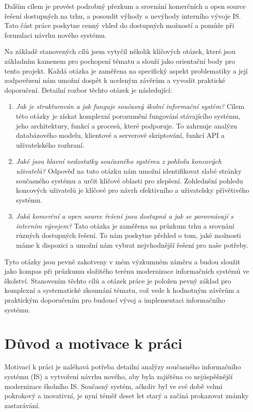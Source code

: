 \documentclass[FM,Proj]{tulthesis}
\begin{document}
Dalším cílem je provést podrobný přezkum a srovnání komerčních a open source řešení
dostupných na trhu, a posoudit výhody a nevýhody interního vývoje IS. Tato část 
práce poskytne cenný vhled do dostupných možností a pomůže při formulaci 
návrhu nového systému.

Na základě stanovených cílů jsem vytyčil několik klíčových otázek, které 
jsou základním kamenem pro pochopení tématu a slouží jako orientační body pro tento 
projekt. Každá otázka je zaměřena na specifický aspekt problematiky a její 
zodpovězení nám umožní dospět k uceleným závěrům a vyvodit praktické doporučení. 
Detailní rozbor těchto otázek je následující:

\begin{enumerate}
\item \textit{Jak je strukturován a jak funguje současný školní informační systém?} 
Cílem této otázky je získat komplexní porozumění fungování stávajícího systému, 
jeho architektury, funkcí a procesů, které podporuje. To zahrnuje analýzu 
databázového modelu, klientové a serverové skriptování, funkcí API a uživatelského rozhraní.

\item \textit{Jaké jsou hlavní nedostatky současného systému z pohledu koncových uživatelů?}
 Odpověď na tuto otázku nám umožní identifikovat slabé stránky současného systému a 
 určit klíčové oblasti pro zlepšení. Zohlednění pohledu koncových uživatelů je 
 klíčové pro návrh efektivního a uživatelsky přívětivého systému.

\item \textit{Jaká komerční a open source řešení jsou dostupná a jak se porovnávají s 
interním vývojem?} Tato otázka je zaměřena na průzkum trhu a srovnání různých dostupných 
řešení. To nám poskytne přehled o tom, jaké možnosti máme k dispozici a umožní nám vybrat 
nejvhodnější řešení pro naše potřeby.
\end{enumerate}

Tyto otázky jsou pevně zakotveny v mém výzkumném záměru a budou sloužit jako kompas 
při průzkumu složitého terénu modernizace informačních systémů ve školství.
Stanovením těchto cílů a otázek práce je položen pevný základ pro komplexní a 
systematické zkoumání tématu, což vede k hodnotným závěrům a praktickým 
doporučením pro budoucí vývoj a implementaci informačního systému.

\section{Důvod a motivace k práci}
Motivací k práci je naléhavá potřeba detailní analýzy současného informačního 
systému (IS) a vytvoření návrhu nového, aby byla zajištěna co nejúspěšnější 
modernizace školního IS. Současný systém, ačkoliv byl ve své době velmi pokrokový 
a inovativní, je nyní téměř deset let starý a začíná prokazovat známky zastarávání.
\end{document}

